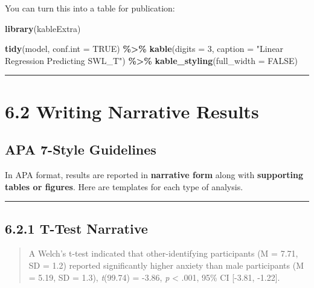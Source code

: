 \documentclass[
]{book}
\newenvironment{Shaded}{\begin{snugshade}}{\end{snugshade}}
\newcommand{\AttributeTok}[1]{\textcolor[rgb]{0.13,0.29,0.53}{#1}}
\newcommand{\ConstantTok}[1]{\textcolor[rgb]{0.56,0.35,0.01}{#1}}
\newcommand{\DecValTok}[1]{\textcolor[rgb]{0.00,0.00,0.81}{#1}}
\newcommand{\FunctionTok}[1]{\textcolor[rgb]{0.13,0.29,0.53}{\textbf{#1}}}
\newcommand{\NormalTok}[1]{#1}
\newcommand{\SpecialCharTok}[1]{\textcolor[rgb]{0.81,0.36,0.00}{\textbf{#1}}}
\newcommand{\StringTok}[1]{\textcolor[rgb]{0.31,0.60,0.02}{#1}}
\begin{document}
You can turn this into a table for publication:

\begin{Shaded}
\begin{Highlighting}[]
\FunctionTok{library}\NormalTok{(kableExtra)}

\FunctionTok{tidy}\NormalTok{(model, }\AttributeTok{conf.int =} \ConstantTok{TRUE}\NormalTok{) }\SpecialCharTok{\%\textgreater{}\%}
  \FunctionTok{kable}\NormalTok{(}\AttributeTok{digits =} \DecValTok{3}\NormalTok{, }\AttributeTok{caption =} \StringTok{"Linear Regression Predicting SWL\_T"}\NormalTok{) }\SpecialCharTok{\%\textgreater{}\%}
  \FunctionTok{kable\_styling}\NormalTok{(}\AttributeTok{full\_width =} \ConstantTok{FALSE}\NormalTok{)}
\end{Highlighting}
\end{Shaded}

\begin{center}\rule{0.5\linewidth}{0.5pt}\end{center}

\section{6.2 Writing Narrative Results}\label{writing-narrative-results}

\subsection{APA 7-Style Guidelines}\label{apa-7-style-guidelines}

In APA format, results are reported in \textbf{narrative form} along with \textbf{supporting tables or figures}. Here are templates for each type of analysis.

\begin{center}\rule{0.5\linewidth}{0.5pt}\end{center}

\subsection{6.2.1 T-Test Narrative}\label{t-test-narrative}

\begin{quote}
A Welch's t-test indicated that other-identifying participants (M = 7.71, SD = 1.2) reported significantly higher anxiety than male participants (M = 5.19, SD = 1.3), \emph{t}(99.74) = -3.86, \emph{p} \textless{} .001, 95\% CI {[}-3.81, -1.22{]}.
\end{quote}
\end{document}
